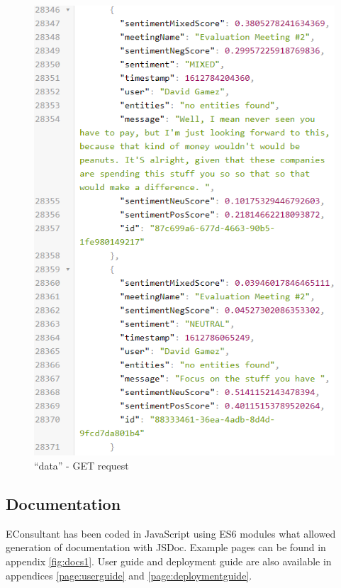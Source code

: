 \documentclass{article}
\begin{document}
\begin{figure}[H]
\begin{minipage}{.48\textwidth}
  \includegraphics[width=1\linewidth]{implementation/chartData.png}
  \caption{``data'' - GET request}
  \label{fig:chartData}
\end{minipage}
\end{figure}

\subsection{Documentation}
{\large
EConsultant has been coded in JavaScript using ES6 modules what allowed generation of documentation with JSDoc. Example pages can be found in appendix \ref{fig:docs1}. User guide and deployment guide are also available in appendices \ref{page:userguide} and \ref{page:deploymentguide}.\par
}
\end{document}
